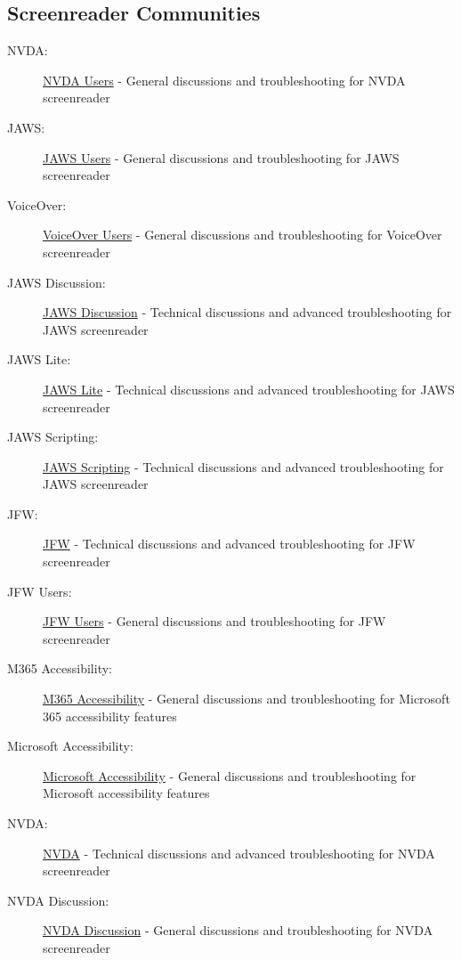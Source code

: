 \subsection{Screenreader Communities}
\label{screenreader-communities}
\begin{description}
    \item[NVDA:] \href{https://groups.google.com/a/nvaccess.org/g/nvda-users}{NVDA Users} - General discussions and troubleshooting for NVDA screenreader
    \item[JAWS:] \href{https://groups.io/g/jaws-users}{JAWS Users} - General discussions and troubleshooting for JAWS screenreader
    \item[VoiceOver:] \href{https://groups.io/g/voiceover-users}{VoiceOver Users} - General discussions and troubleshooting for VoiceOver screenreader
    \item[JAWS Discussion:] \href{https://groups.io/g/jawsdiscussion/messages}{JAWS Discussion} - Technical discussions and advanced troubleshooting for JAWS screenreader
    \item[JAWS Lite:] \href{https://groups.io/g/jawslite/messages}{JAWS Lite} - Technical discussions and advanced troubleshooting for JAWS screenreader
    \item[JAWS Scripting:] \href{https://groups.io/g/jawsscripting/messages}{JAWS Scripting} - Technical discussions and advanced troubleshooting for JAWS screenreader
    \item[JFW:] \href{https://jfw.groups.io/g/main/messages}{JFW} - Technical discussions and advanced troubleshooting for JFW screenreader
    \item[JFW Users:] \href{https://groups.io/g/jfw-users/messages}{JFW Users} - General discussions and troubleshooting for JFW screenreader
    \item[M365 Accessibility:] \href{https://groups.io/g/M365-Accessibility/messages}{M365 Accessibility} - General discussions and troubleshooting for Microsoft 365 accessibility features
    \item[Microsoft Accessibility:] \href{https://groups.io/g/MicrosoftAccessibility/messages}{Microsoft Accessibility} - General discussions and troubleshooting for Microsoft accessibility features
    \item[NVDA:] \href{https://nvda.groups.io/g/nvda/messages}{NVDA} - Technical discussions and advanced troubleshooting for NVDA screenreader
    \item[NVDA Discussion:] \href{https://groups.io/g/nvdadiscussion/messages}{NVDA Discussion} - General discussions and troubleshooting for NVDA screenreader

\end{description}
